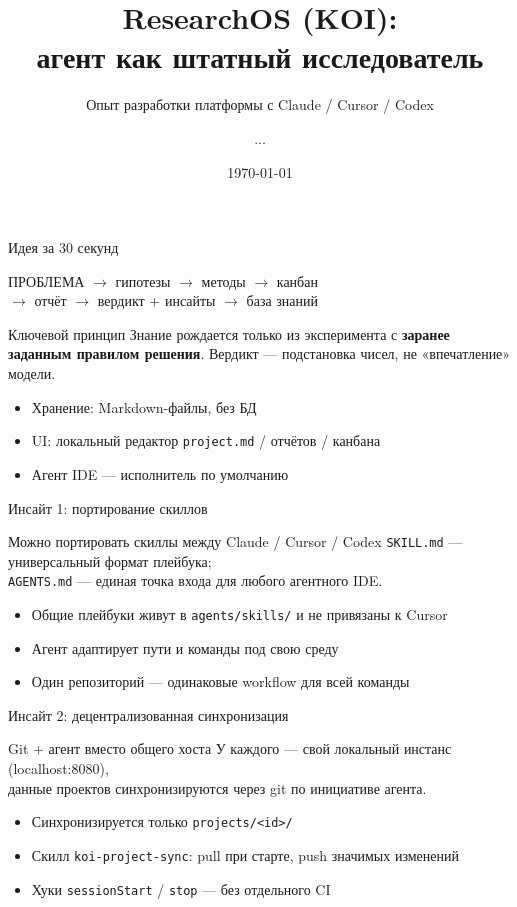 \documentclass[aspectratio=169,11pt]{beamer}
\title{ResearchOS (KOI):\\агент как штатный исследователь}
\subtitle{Опыт разработки платформы с Claude / Cursor / Codex}
\author{...}
\institute{...}
\date{\today}
\begin{document}
\begin{frame}
  \titlepage
\end{frame}

\begin{frame}{Идея за 30 секунд}
  \begin{center}
    \small
    ПРОБЛЕМА $\rightarrow$ гипотезы $\rightarrow$ методы $\rightarrow$ канбан\\
    $\rightarrow$ отчёт $\rightarrow$ вердикт + инсайты $\rightarrow$ база знаний
  \end{center}
  \vspace{0.5em}
  \begin{block}{Ключевой принцип}
    Знание рождается только из эксперимента с \textbf{заранее заданным правилом решения}.
    Вердикт --- подстановка чисел, не «впечатление» модели.
  \end{block}
  \begin{itemize}
    \item Хранение: Markdown-файлы, без БД
    \item UI: локальный редактор \texttt{project.md} / отчётов / канбана
    \item Агент IDE --- исполнитель по умолчанию
  \end{itemize}
\end{frame}

\begin{frame}{Инсайт 1: портирование скиллов}
  \begin{block}{Можно портировать скиллы между Claude / Cursor / Codex}
    \texttt{SKILL.md} --- универсальный формат плейбука;\\
    \texttt{AGENTS.md} --- единая точка входа для любого агентного IDE.
  \end{block}
  \begin{itemize}
    \item Общие плейбуки живут в \texttt{agents/skills/} и не привязаны к Cursor
    \item Агент адаптирует пути и команды под свою среду
    \item Один репозиторий --- одинаковые workflow для всей команды
  \end{itemize}
\end{frame}

\begin{frame}{Инсайт 2: децентрализованная синхронизация}
  \begin{block}{Git + агент вместо общего хоста}
    У каждого --- свой локальный инстанс (localhost:8080),\\
    данные проектов синхронизируются через git по инициативе агента.
  \end{block}
  \begin{itemize}
    \item Синхронизируется только \texttt{projects/<id>/}
    \item Скилл \texttt{koi-project-sync}: pull при старте, push значимых изменений
    \item Хуки \texttt{sessionStart} / \texttt{stop} --- без отдельного CI
  \end{itemize}
\end{frame}
\end{document}

